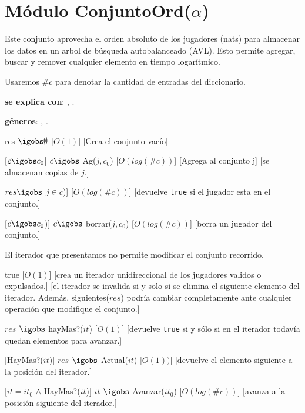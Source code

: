 \section{Módulo ConjuntoOrd($\alpha$)}

Este conjunto aprovecha el orden absoluto de los jugadores (nats) para almacenar los datos en un arbol de búsqueda autobalanceado (AVL). Esto permite agregar, buscar y remover cualquier elemento en tiempo logarítmico.

Usaremos $\#c$ para denotar la cantidad de entradas del diccionario.

\begin{Interfaz}
	\textbf{se explica con}: , .

	\textbf{géneros}: , .


	{res $\igobs \emptyset$ }
	[$O(1)$]
	[Crea el conjunto vacío]

	[$c \igobs c_0$]
	{$c \igobs$ Ag($j, c_0$)}
	[$O(log(\#c))$]
	[Agrega al conjunto j]
	[se almacenan copias de $j$.]

	{$res \igobs$ $j \in c$)]}
	[$O(log(\#c))$]
	[devuelve \texttt{true} si el jugador esta en el conjunto.]

	[$c \igobs c_0$)]
	{$c \igobs$ borrar($j, c_0$)}
	[$O(log(\#c))$]
	[borra un jugador del conjunto.]



	El iterador que presentamos no permite modificar el conjunto recorrido.


	{true}
	[$O(1)$]
	[crea un iterador unidireccional de los jugadores validos o expulsados.]
	[el iterador se invalida si y solo si se elimina el siguiente elemento del iterador. Además, siguientes($res$) podría cambiar completamente ante cualquier operación que modifique el conjunto.]

	{$res$ $\igobs$ hayMas?($it$)}
	[$O(1)$]
	[devuelve \texttt{true} si y sólo si en el iterador todavía quedan elementos para avanzar.]

	[HayMas?($it$)]
	{$res$ $\igobs$ Actual($it$)}
	[$O(1))$]
	[devuelve el elemento siguiente a la posición del iterador.]

	[$it = it_0$ $\land$ HayMas?($it$)]
	{$it$ $\igobs$ Avanzar($it_0$)}
	[$O(log(\#c))$]
	[avanza a la posición siguiente del iterador.]

\end{Interfaz}


